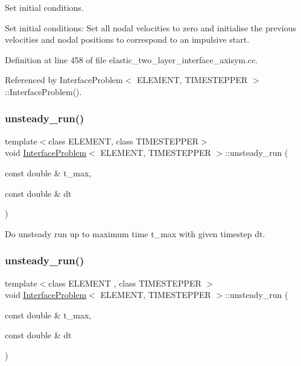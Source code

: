 Set initial conditions. 

Set initial conditions\+: Set all nodal velocities to zero and initialise the previous velocities and nodal positions to correspond to an impulsive start. 

Definition at line 458 of file elastic\+\_\+two\+\_\+layer\+\_\+interface\+\_\+axisym.\+cc.



Referenced by Interface\+Problem$<$ E\+L\+E\+M\+E\+N\+T, T\+I\+M\+E\+S\+T\+E\+P\+P\+E\+R $>$\+::\+Interface\+Problem().

\mbox{\label{classInterfaceProblem_adf1f4e43d10939e4323e0e315b711085}} 
\subsubsection{\texorpdfstring{unsteady\+\_\+run()}{unsteady\_run()}\hspace{0.1cm}{\footnotesize\ttfamily [1/2]}}
{\footnotesize\ttfamily template$<$class E\+L\+E\+M\+E\+NT, class T\+I\+M\+E\+S\+T\+E\+P\+P\+ER$>$ \\
void \hyperlink{classInterfaceProblem}{Interface\+Problem}$<$ E\+L\+E\+M\+E\+NT, T\+I\+M\+E\+S\+T\+E\+P\+P\+ER $>$\+::unsteady\+\_\+run (\begin{DoxyParamCaption}\item[{const double \&}]{t\+\_\+max,  }\item[{const double \&}]{dt }\end{DoxyParamCaption})}



Do unsteady run up to maximum time t\+\_\+max with given timestep dt. 

\mbox{\label{classInterfaceProblem_adf1f4e43d10939e4323e0e315b711085}} 
\subsubsection{\texorpdfstring{unsteady\+\_\+run()}{unsteady\_run()}\hspace{0.1cm}{\footnotesize\ttfamily [2/2]}}
{\footnotesize\ttfamily template$<$class E\+L\+E\+M\+E\+NT , class T\+I\+M\+E\+S\+T\+E\+P\+P\+ER $>$ \\
void \hyperlink{classInterfaceProblem}{Interface\+Problem}$<$ E\+L\+E\+M\+E\+NT, T\+I\+M\+E\+S\+T\+E\+P\+P\+ER $>$\+::unsteady\+\_\+run (\begin{DoxyParamCaption}\item[{const double \&}]{t\+\_\+max,  }\item[{const double \&}]{dt }\end{DoxyParamCaption})}



